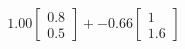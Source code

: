 \documentclass[preview]{standalone}
\begin{document}
\begin{align*}
1.00 \begin{bmatrix} 0.8 \\ 0.5 \end{bmatrix} + -0.66 \begin{bmatrix} 1 \\ 1.6 \end{bmatrix}
\end{align*}
\end{document}
